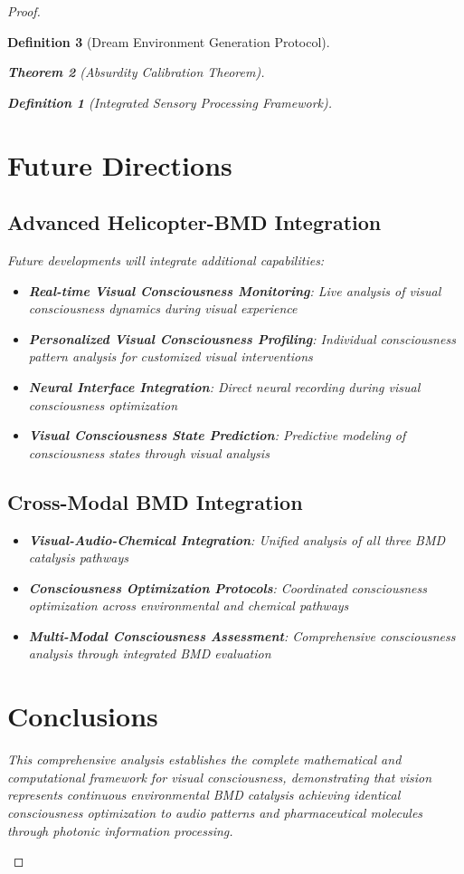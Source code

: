 \documentclass[12pt,a4paper]{article}
\newtheorem{theorem}{Theorem}[section]
\newtheorem{definition}[theorem]{Definition}
\begin{document}
\begin{proof}
\begin{definition}[Dream Environment Generation Protocol]
\begin{theorem}[Absurdity Calibration Theorem]
\begin{observation}
\begin{definition}[Integrated Sensory Processing Framework]
\section{Future Directions}

\subsection{Advanced Helicopter-BMD Integration}

Future developments will integrate additional capabilities:

\begin{itemize}
\item \textbf{Real-time Visual Consciousness Monitoring}: Live analysis of visual consciousness dynamics during visual experience
\item \textbf{Personalized Visual Consciousness Profiling}: Individual consciousness pattern analysis for customized visual interventions
\item \textbf{Neural Interface Integration}: Direct neural recording during visual consciousness optimization
\item \textbf{Visual Consciousness State Prediction}: Predictive modeling of consciousness states through visual analysis
\end{itemize}

\subsection{Cross-Modal BMD Integration}

\begin{itemize}
\item \textbf{Visual-Audio-Chemical Integration}: Unified analysis of all three BMD catalysis pathways
\item \textbf{Consciousness Optimization Protocols}: Coordinated consciousness optimization across environmental and chemical pathways
\item \textbf{Multi-Modal Consciousness Assessment}: Comprehensive consciousness analysis through integrated BMD evaluation
\end{itemize}

\section{Conclusions}

This comprehensive analysis establishes the complete mathematical and computational framework for visual consciousness, demonstrating that vision represents continuous environmental BMD catalysis achieving identical consciousness optimization to audio patterns and pharmaceutical molecules through photonic information processing.


\end{definition}
\end{observation}
\end{theorem}
\end{definition}
\end{proof}
\end{document}
